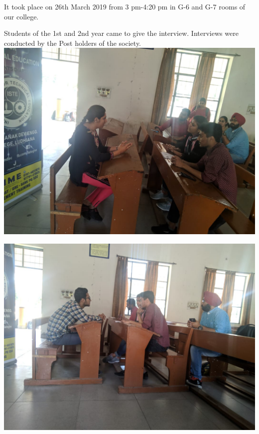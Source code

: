 \documentclass[12pt, a4 paper]{article}
\begin{document}
\begin{center}
\begin{Large}
\begin{multicols}{2}


\columnbreak
It took place on 26th March 2019 from 3 pm-4:20 pm in G-6 and G-7 rooms of our college.
\end{multicols}

\newpage 


\begin{multicols}{2}
Students of the 1st and 2nd year came to give the interview. Interviews were conducted by the Post holders of the society.
\columnbreak
\includegraphics[width=\linewidth]{image3.jpg}
  
\end{multicols}

\begin{multicols}{2}
\includegraphics[width=\linewidth]{image5.jpg}


\end{multicols}
\end{Large}
\end{center}
\end{document}
